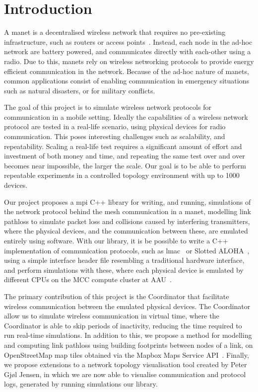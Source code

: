 \chapter{Introduction}\label{ch:introduction}
A \gls{manet} is a decentralised wireless network that requires no pre-existing infrastructure, such as
routers or access points~\cite{inproceedings:routingsurvery}. Instead, each node in the ad-hoc network are
battery powered, and communicates directly with each-other using a radio. Due to this, \gls{manet}s rely on
wireless networking protocols to provide energy efficient communication in the network. Because of the ad-hoc
nature of \gls{manet}s, common applications consist of enabling communication in emergency situations such as
natural disasters, or for military conflicts.\smallbreak

The goal of this project is to simulate wireless network protocols for communication in a mobile setting.
Ideally the capabilities of a wireless network protocol are tested in a real-life scenario, using physical
devices for radio communication. This poses interesting challenges such as scalability, and repeatability.
Scaling a real-life test requires a significant amount of effort and investment of both money and time, and
repeating the same test over and over becomes near impossible, the larger the scale. Our goal is to be able to
perform repeatable experiments in a controlled topology environment with up to 1000 devices.\smallbreak

Our project proposes a \gls{mpi} C++ library for writing, and running, simulations of the network protocol
behind the mesh communication in a \gls{manet}, modelling link \gls{pathloss} to simulate packet loss and
collisions caused by interfering transmitters, where the physical devices, and the communication between
these, are emulated entirely using software. With our library, it is be possible to write a C++ implementation
of communication protocols, such as \gls{lmac}~\cite{paper:lmac_protocol} or Slotted
ALOHA~\cite{Roberts:1975:APS:1024916.1024920}, using a simple interface header file resembling a traditional
hardware interface, and perform simulations with these, where each physical device is emulated by different
CPUs on the MCC compute cluster at AAU~\cite{website:mccaau}. \smallbreak

The primary contribution of this project is the Coordinator that facilitate wireless communication between the
emulated physical devices. The Coordinator allow us to simulate wireless communication in virtual time, where
the Coordinator is able to skip periods of inactivity, reducing the time required to run real-time
simulations. In addition to this, we propose a method for modelling and computing link \gls{pathloss} using
building footprints between nodes of a link, on OpenStreetMap map tiles obtained via the Mapbox Maps Service
API~\cite{website:mapbox}. Finally, we propose extensions to a network topology visualisation tool created by
Peter Gjøl Jensen, in which we are now able to visualise communication and protocol logs, generated by running
simulations our library.


